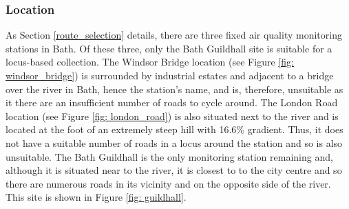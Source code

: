 \documentclass[11pt,twosided,a4paper]{report}
\begin{document}
\subsubsection{Location}

As Section \ref{route_selection} details, there are three fixed air quality monitoring stations in Bath. Of these three, only the Bath Guildhall site is suitable for a locus-based collection. The Windsor Bridge location (see Figure \ref{fig: windsor_bridge}) is surrounded by industrial estates and adjacent to a bridge over the river in Bath, hence the station's name, and is, therefore, unsuitable as it there are an insufficient number of roads to cycle around. The London Road location (see Figure \ref{fig: london_road}) is also situated next to the river and is located at the foot of an extremely steep hill with 16.6\% gradient. Thus, it does not have a suitable number of roads in a locus around the station and so is also unsuitable. The Bath Guildhall is the only monitoring station remaining and, although it is situated near to the river, it is closest to to the city centre and so there are numerous roads in its vicinity and on the opposite side of the river. This site is shown in Figure \ref{fig: guildhall}.
\end{document}
